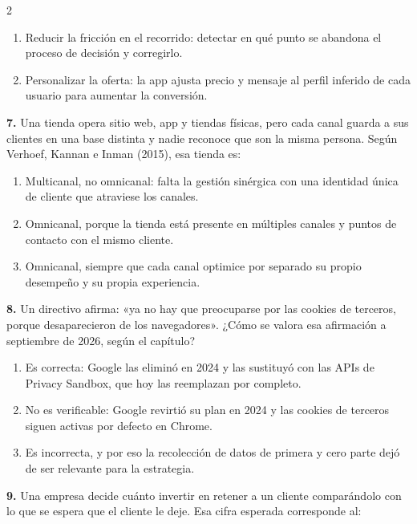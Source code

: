 \documentclass[10pt,letterpaper]{article}
\begin{document}
\begin{multicols}{2}
\begin{enumerate}[label=\alph*),leftmargin=1.1em,itemsep=0pt,topsep=1pt,parsep=0pt,partopsep=0pt]
\item Reducir la fricción en el recorrido: detectar en qué punto se abandona el proceso de decisión y corregirlo.
\item Personalizar la oferta: la app ajusta precio y mensaje al perfil inferido de cada usuario para aumentar la conversión.
\end{enumerate}
\vspace{2pt}
\noindent\textbf{7.} Una tienda opera sitio web, app y tiendas físicas, pero cada canal guarda a sus clientes en una base distinta y nadie reconoce que son la misma persona. Según Verhoef, Kannan e Inman (2015), esa tienda es:
\vspace{-3pt}
\begin{enumerate}[label=\alph*),leftmargin=1.1em,itemsep=0pt,topsep=1pt,parsep=0pt,partopsep=0pt]
\item Multicanal, no omnicanal: falta la gestión sinérgica con una identidad única de cliente que atraviese los canales.
\item Omnicanal, porque la tienda está presente en múltiples canales y puntos de contacto con el mismo cliente.
\item Omnicanal, siempre que cada canal optimice por separado su propio desempeño y su propia experiencia.
\end{enumerate}
\vspace{2pt}
\noindent\textbf{8.} Un directivo afirma: «ya no hay que preocuparse por las cookies de terceros, porque desaparecieron de los navegadores». ¿Cómo se valora esa afirmación a septiembre de 2026, según el capítulo?
\vspace{-3pt}
\begin{enumerate}[label=\alph*),leftmargin=1.1em,itemsep=0pt,topsep=1pt,parsep=0pt,partopsep=0pt]
\item Es correcta: Google las eliminó en 2024 y las sustituyó con las APIs de Privacy Sandbox, que hoy las reemplazan por completo.
\item No es verificable: Google revirtió su plan en 2024 y las cookies de terceros siguen activas por defecto en Chrome.
\item Es incorrecta, y por eso la recolección de datos de primera y cero parte dejó de ser relevante para la estrategia.
\end{enumerate}
\vspace{2pt}
\noindent\textbf{9.} Una empresa decide cuánto invertir en retener a un cliente comparándolo con lo que se espera que el cliente le deje. Esa cifra esperada corresponde al:
\vspace{-3pt}

\end{multicols}
\end{document}
